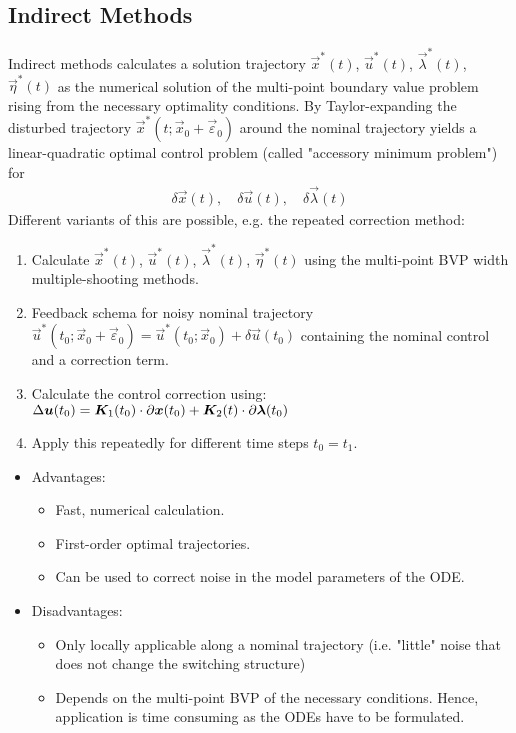 		\subsection{Indirect Methods}
			Indirect methods calculates a solution trajectory \( \vec{x}^\ast(t) \), \( \vec{u}^\ast(t) \), \( \vec{\lambda}^\ast(t) \), \( \vec{\eta}^\ast(t) \) as the numerical solution of the multi-point boundary value problem rising from the necessary optimality conditions. By Taylor-expanding the disturbed trajectory \( \vec{x}^\ast(t; \vec{x}_0 + \vec{\varepsilon}_0) \) around the nominal trajectory yields a linear-quadratic optimal control problem (called "accessory minimum problem") for
			\begin{align*}
				\delta\vec{x}(t),\quad \delta\vec{u}(t),\quad \delta\vec{\lambda}(t)
			\end{align*}
			Different variants of this are possible, e.g. the repeated correction method:
			\begin{enumerate}
				\item Calculate \( \vec{x}^\ast(t) \), \( \vec{u}^\ast(t) \), \( \vec{\lambda}^\ast(t) \), \( \vec{\eta}^\ast(t) \) using the multi-point BVP width multiple-shooting methods.
				\item Feedback schema for noisy nominal trajectory \( \vec{u}^\ast(t_0; \vec{x}_0 + \vec{\varepsilon}_0) = \vec{u}^\ast(t_0; \vec{x}_0) + \delta\vec{u}(t_0) \) containing the nominal control and a correction term.
				\item Calculate the control correction using: \( \Delta\bm{u}(t_0) = \bm{K}_1(t_0) \cdot \partial\bm{x}(t_0) + \bm{K}_2(t) \cdot \partial\bm{\lambda}(t_0) \)
				\item Apply this repeatedly for different time steps \( t_0 = t_1 \).
			\end{enumerate}

			\begin{itemize}
				\item Advantages:
					\begin{itemize}
						\item Fast, numerical calculation.
						\item First-order optimal trajectories.
						\item Can be used to correct noise in the model parameters of the ODE.
					\end{itemize}
				\item Disadvantages:
					\begin{itemize}
						\item Only locally applicable along a nominal trajectory (i.e. "little" noise that does not change the switching structure)
						\item Depends on the multi-point BVP of the necessary conditions. Hence, application is time consuming as the ODEs have to be formulated.
					\end{itemize}
			\end{itemize}

